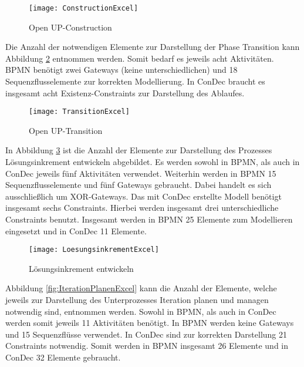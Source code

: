 \begin{figure}[htp]
\begin{center}
  \texttt{[image: ConstructionExcel]} %
  \caption{Open UP-Construction}
  \label{fig:ConstructionExcel}
\end{center}
\end{figure}

Die Anzahl der notwendigen Elemente zur Darstellung der Phase Transition kann Abbildung \ref{fig:TransitionExcel} entnommen werden. Somit bedarf es jeweils acht Aktivitäten. BPMN benötigt zwei Gateways (keine unterschiedlichen) und 18 Sequenzflusselemente zur korrekten Modellierung. In ConDec braucht es insgesamt acht Existenz-Constraints zur Darstellung des Ablaufes.\newline

\begin{figure}[htp]
\begin{center}
  \texttt{[image: TransitionExcel]} %
  \caption{Open UP-Transition}
  \label{fig:TransitionExcel}
\end{center}
\end{figure}

In Abbildung \ref{fig:LoesungsinkrementExcel} ist die Anzahl der Elemente zur Darstellung des Prozesses Lösungsinkrement entwickeln abgebildet. Es werden sowohl in BPMN, als auch in ConDec jeweils fünf Aktivitäten verwendet. Weiterhin werden in BPMN 15 Sequenzflusselemente und fünf Gateways gebraucht. Dabei handelt es sich ausschließlich um XOR-Gateways. Das mit ConDec erstellte Modell benötigt insgesamt sechs Constraints. Hierbei werden insgesamt drei unterschiedliche Constraints benutzt. Insgesamt werden in BPMN 25 Elemente zum Modellieren eingesetzt und in ConDec 11 Elemente.\newline

\begin{figure}[htp]
\begin{center}
  \texttt{[image: LoesungsinkrementExcel]} %
  \caption{Lösungsinkrement entwickeln}
  \label{fig:LoesungsinkrementExcel}
\end{center}
\end{figure}


Abbildung \ref{fig:IterationPlanenExcel} kann die Anzahl der Elemente, welche jeweils zur Darstellung des Unterprozesses Iteration planen und managen notwendig sind, entnommen werden. Sowohl in BPMN, als auch in ConDec werden somit jeweils 11 Aktivitäten benötigt. In BPMN werden keine Gateways und 15 Sequenzflüsse verwendet. In ConDec sind zur korrekten Darstellung 21 Constraints notwendig. Somit werden in BPMN insgesamt 26 Elemente und in ConDec 32 Elemente gebraucht.\newline

